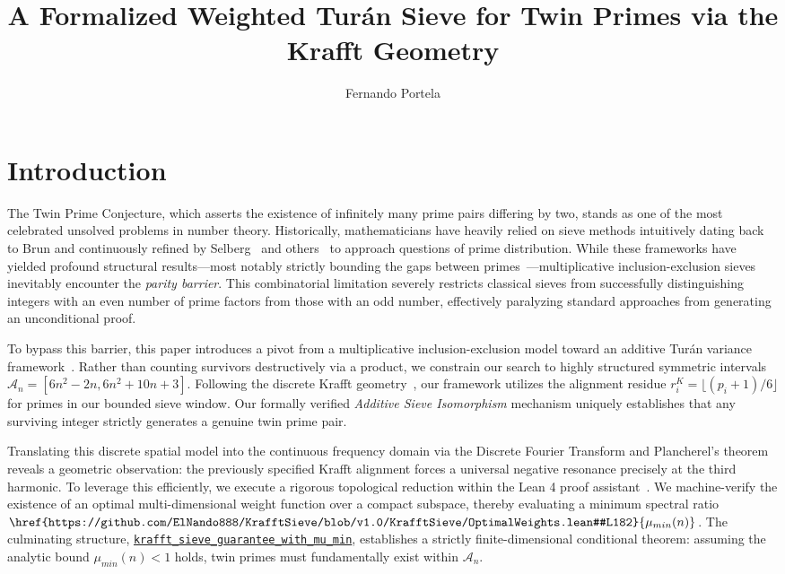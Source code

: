\documentclass[lean]{AFM}
\title[A Formalized Weighted Turán Sieve for Twin Primes]{A Formalized Weighted
Turán Sieve for Twin Primes via the Krafft Geometry}
\author[F. Portela]{Fernando Portela}
\renewcommand{\.}{\hskip .75pt}
\def\urlpfx{https://github.com/ElNando888/KrafftSieve/blob/v1.0}
\begin{document}
\section{Introduction} \label{introduction}

The Twin Prime Conjecture, which asserts the existence of infinitely many prime pairs differing by
two, stands as one of the most celebrated unsolved problems in number theory. Historically,
mathematicians have heavily relied on sieve methods intuitively dating back to Brun and
continuously refined by Selberg~\cite{Selberg1947} and others~\cite{MontgomeryVaughan2006} to
approach questions of prime distribution. While these frameworks have yielded profound structural
results—most notably strictly bounding the gaps between
primes~\cite{GPY2009,Maynard2015,Polymath8a,Polymath8b}—multiplicative inclusion-exclusion sieves
inevitably encounter the \textit{parity barrier}. This combinatorial limitation severely restricts
classical sieves from successfully distinguishing integers with an even number of prime factors
from those with an odd number, effectively paralyzing standard approaches from generating an
unconditional proof.

To bypass this barrier, this paper introduces a pivot from a multiplicative inclusion-exclusion
model toward an additive Turán variance framework~\cite{Turan1934}. Rather than counting survivors
destructively via a product, we constrain our search to highly structured symmetric intervals
$\mathcal{A}_n = [6n^2 - 2n, 6n^2 + 10n + 3]$. Following the discrete Krafft
geometry~\cite{Krafft1801,Portela2026}, our framework utilizes the alignment residue
$r^K_i = \lfloor(p_i+1)/6\rfloor$ for primes in our bounded sieve window. Our formally verified
\textit{Additive Sieve Isomorphism} mechanism uniquely establishes that any surviving integer
strictly generates a genuine twin prime pair.

Translating this discrete spatial model into the continuous frequency domain via the Discrete
Fourier Transform and Plancherel's theorem reveals a geometric observation: the previously specified
Krafft alignment forces a universal negative resonance precisely at the third harmonic. To
leverage this efficiently, we execute a rigorous topological reduction within the Lean 4 proof
assistant~\cite{MouraUllrich2021,Mathlib}. We machine-verify the existence of an optimal
multi-dimensional weight function over a compact subspace, thereby evaluating a minimum
spectral ratio $\href{\urlpfx/KrafftSieve/OptimalWeights.lean#L182}{\mu_{min}(n)}$. The culminating
structure, \href{\urlpfx/KrafftSieve/OptimalWeights.lean#L693}
{\texttt{krafft\_sieve\_guarantee\_with\_mu\_min}}, establishes a strictly finite-dimensional
conditional theorem: assuming the analytic bound $\mu_{min}(n) < 1$ holds, twin primes must
fundamentally exist within $\mathcal{A}_n$.
\end{document}
